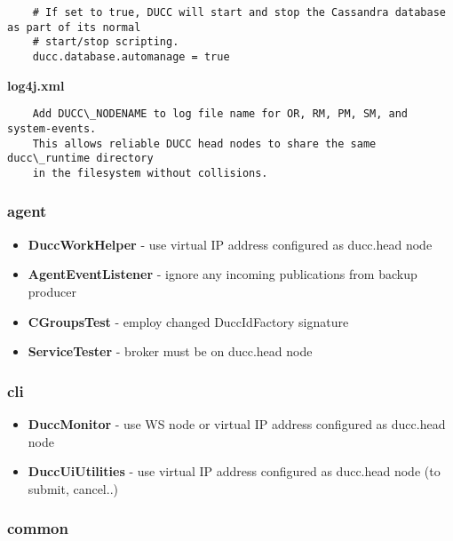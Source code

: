 \documentclass[letterpaper]{article}
\begin{document}
	\begin{verbatim}
	# If set to true, DUCC will start and stop the Cassandra database as part of its normal
	# start/stop scripting.  
	ducc.database.automanage = true
	\end{verbatim}

\textbf{log4j.xml}

   \begin{verbatim}
    Add DUCC\_NODENAME to log file name for OR, RM, PM, SM, and system-events.
    This allows reliable DUCC head nodes to share the same ducc\_runtime directory
    in the filesystem without collisions.
   \end{verbatim}

\subsubsection{agent}

{\renewcommand\labelitemi{}
\begin{itemize}
  \item \textbf{DuccWorkHelper} - use virtual IP address configured as ducc.head node
  \item \textbf{AgentEventListener} - ignore any incoming publications from backup producer
  \item \textbf{CGroupsTest} - employ changed DuccIdFactory signature
  \item \textbf{ServiceTester} - broker must be on ducc.head node
\end{itemize}
}

\subsubsection{cli}

{\renewcommand\labelitemi{}
\begin{itemize}
  \item \textbf{DuccMonitor} - use WS node or virtual IP address configured as ducc.head node
  \item \textbf{DuccUiUtilities} - use virtual IP address configured as ducc.head node (to submit, cancel..)
\end{itemize}
}

\subsubsection{common}
\end{document}
